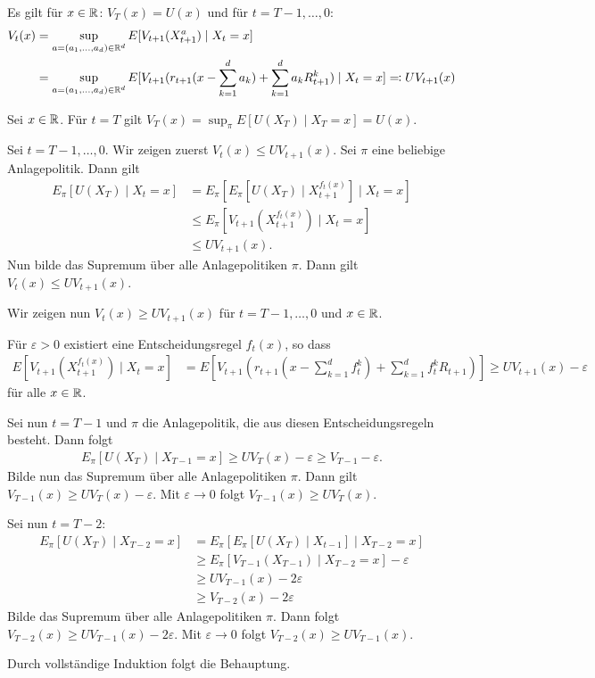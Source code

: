 \documentclass[a4paper,twoside,DIV15,BCOR12mm]{scrbook}
\begin{document}
\begin{satz}
Es gilt für $x\in\mathbb{R}$: $V_T(x) = U(x)$ und für $t=T-1,\ldots, 0$:
\begin{align*}
V_t(x) &= \sup_{a=(a_1,\ldots,a_d)\in\MdR^d} E[V_{t+1}(X_{t+1}^a) \mid X_t =x] \\
      &= \sup_{a=(a_1,\ldots,a_d)\in\MdR^d} E[V_{t+1}(r_{t+1}(x-\sum_{k=1}^d a_k) + \sum_{k=1}^d a_kR_{t+1}^k) \mid X_t =x] \ad UV_{t+1}(x)
\end{align*}
\end{satz}

\begin{beweis}
Sei $x\in\mathbb{R}$. Für $t=T$ gilt $V_T(x)=\sup_{\pi} E[U(X_T)\mid X_T=x] = U(x)$.

Sei $t=T-1,\ldots, 0$. Wir zeigen zuerst $V_t(x) \le UV_{t+1}(x)$. Sei $\pi$ eine beliebige Anlagepolitik. Dann gilt
\begin{align*}
E_\pi[U(X_T) \mid X_t=x] &= E_\pi[ E_\pi[U(X_T)\mid X_{t+1}^{f_t(x)}] \mid X_t=x] \\
&\le E_\pi[ V_{t+1}(X_{t+1}^{f_t(x)}) \mid X_t = x] \\
&\le UV_{t+1}(x).
\end{align*}
Nun bilde das Supremum über alle Anlagepolitiken $\pi$. Dann gilt $V_t(x) \le UV_{t+1}(x)$. 

Wir zeigen nun $V_t(x) \ge UV_{t+1}(x)$ für $t=T-1,\ldots,0$ und $x\in\mathbb{R}$.

Für $\varepsilon>0$ existiert eine Entscheidungsregel $f_t(x)$, so dass 
\begin{align*}
E[V_{t+1}(X_{t+1}^{f_t(x)}) \mid X_t = x] &= E[V_{t+1}(r_{t+1}(x-\sum_{k=1}^d f_t^k) + \sum_{k=1}^d f_t^k R_{t+1})] 
\ge UV_{t+1}(x) - \varepsilon
\end{align*}
für alle $x\in\mathbb{R}$.

Sei nun $t=T-1$ und $\pi$ die Anlagepolitik, die aus diesen Entscheidungsregeln besteht. Dann folgt
\begin{align*}
E_\pi[U(X_T) \mid X_{T-1} = x] \ge UV_T(x) - \varepsilon \ge V_{T-1} - \varepsilon.
\end{align*}
Bilde nun das Supremum über alle Anlagepolitiken $\pi$. Dann gilt $V_{T-1}(x) \ge UV_T(x) - \varepsilon$. Mit $\varepsilon \to 0$ folgt $V_{T-1}(x) \ge UV_T(x)$.

Sei nun $t=T-2$:
\begin{align*}
E_\pi[U(X_T) \mid X_{T-2}=x] &= E_\pi[ E_\pi[ U(X_T) \mid X_{t-1}] \mid X_{T-2} = x] \\
&\ge E_\pi[ V_{T-1}(X_{T-1}) \mid X_{T-2} = x] - \varepsilon \\
&\ge UV_{T-1}(x) - 2\varepsilon  \\
&\ge V_{T-2}(x) - 2\varepsilon
\end{align*}
Bilde das Supremum über alle Anlagepolitiken $\pi$. Dann folgt $V_{T-2}(x) \ge UV_{T-1}(x) - 2\varepsilon$.  Mit $\varepsilon \to 0$ folgt $V_{T-2}(x) \ge UV_{T-1}(x)$.

Durch vollständige Induktion folgt die Behauptung.
\end{beweis}
\end{document}
